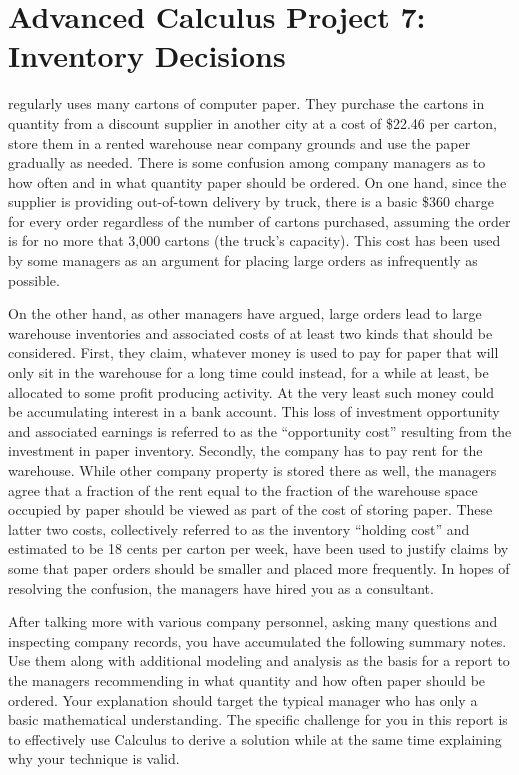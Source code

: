 \documentclass
[justified,nohyper]
{tufte-handout}
\begin{document}
\section{Advanced Calculus Project 7: Inventory Decisions}

 regularly uses many cartons of computer paper. They purchase the cartons in quantity from a discount supplier in another city at a cost of \$22.46 per carton, store them in a rented warehouse near company grounds and use the paper gradually as needed. There is some confusion among company managers as to how often and in what quantity paper should be ordered. On one hand, since the supplier is providing out-of-town delivery by truck, there is a basic \$360 charge for every order regardless of the number of cartons purchased, assuming the order is for no more that 3,000 cartons (the truck's capacity). This cost has been used by some managers as an argument for placing large orders as infrequently as possible.

On the other hand, as other managers have argued, large orders lead to large warehouse inventories and associated costs of at least two kinds that should be considered. First, they claim, whatever money is used to pay for paper that will only sit in the warehouse for a long time could instead, for a while at least, be allocated to some profit producing activity. At the very least such money could be accumulating interest in a bank account. This loss of investment opportunity and associated earnings is referred to as the ``opportunity cost'' resulting from the investment in paper inventory. Secondly, the company has to pay rent for the warehouse. While other company property is stored there as well, the managers agree that a fraction of the rent equal to the fraction of the warehouse space occupied by paper should be viewed as part of the cost of storing paper. These latter two costs, collectively referred to as the inventory ``holding cost'' and estimated to be 18 cents per carton per week, have been used to justify claims by some that paper orders should be smaller and placed more frequently. In hopes of resolving the confusion, the managers have hired you as a consultant.

After talking more with various company personnel, asking many questions and inspecting company records, you have accumulated the following summary notes. Use them along with additional modeling and analysis as the basis for a report to the managers recommending in what quantity and how often paper should be ordered. Your explanation should target the typical manager who has only a basic mathematical understanding. The specific challenge for you in this report is to effectively use Calculus to derive a solution while at the same time explaining why your technique is valid.
\end{document}
